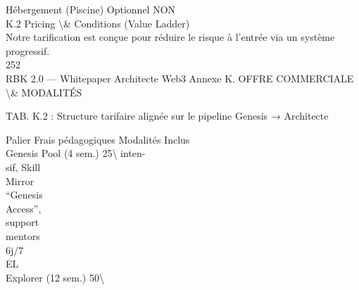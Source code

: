 Hébergement (Piscine)                                                               Optionnel NON\\
\vspace{0.5em}
\vspace{0.5em}
\vspace{0.5em}
K.2 Pricing \textbackslash{}& Conditions (Value Ladder)\\
Notre tarification est conçue pour réduire le risque à l’entrée via un système progressif.\\
\vspace{0.5em}
\vspace{0.5em}
\vspace{0.5em}
\vspace{0.5em}
252\\
RBK 2.0 — Whitepaper Architecte Web3                                                         Annexe K. OFFRE COMMERCIALE \textbackslash{}& MODALITÉS\\
\vspace{0.5em}
\vspace{0.5em}
\begin{center}\begin{tabular}TAB. K.2 : Structure tarifaire alignée sur le pipeline Genesis → Architecte\end{tabular}\end{center}
\vspace{0.5em}
\vspace{0.5em}
Palier                                 Frais pédagogiques                 Modalités                                               Inclus\\
Genesis Pool (4 sem.)                  25\textbackslash{}%
inten-\\
sif, Skill\\
Mirror\\
“Genesis\\
Access”,\\
support\\
mentors\\
6j/7\\
\vspace{0.5em}
\vspace{0.5em}
\vspace{0.5em}
\vspace{0.5em}
EL\\
Explorer (12 sem.)                  50\textbackslash{}%
